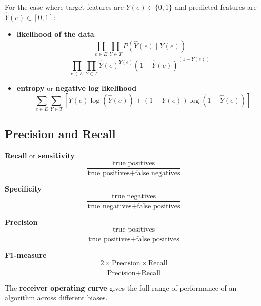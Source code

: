 \documentclass[11pt]{article}
\begin{document}
For the case where target features are \(Y(e) \in \{0, 1\}\) and predicted features are
\(\hat{Y}(e) \in [0, 1]\):
\begin{itemize}
\item \textbf{likelihood of the data}:
$$
  \prod_{e \in E} \prod_{Y \in T} P(\hat{Y}(e) \mid Y(e))
  $$
$$
  \prod_{e \in E} \prod_{Y \in  T} \hat{Y}(e)^{Y(e)} (1 - \hat{Y}(e))^{(1 - Y(e))}
  $$
\item \textbf{entropy} or \textbf{negative log likelihood}
$$
  -\sum_{e \in E} \sum_{Y \in T} \left[ Y(e) \log( \hat{Y}(e) ) + (1 - Y(e)) \log ( 1 - \hat{Y}(e) ) \right]
  $$
\end{itemize}
\subsection{Precision and Recall}
\label{sec:orgdbb25f3}
\textbf{Recall} or \textbf{sensitivity}
$$
\frac{\text{true positives}}{\text{true positives} + \text{false negatives}}
$$

\textbf{Specificity}
$$
\frac{\text{true negatives}}{\text{true negatives} + \text{false positives}}
$$

\textbf{Precision}
$$
\frac{\text{true positives}}{\text{true positives} + \text{false positives}}
$$

\textbf{F1-measure}
$$
\frac{2 \times \text{Precision} \times \text{Recall}}{\text{Precision} + \text{Recall}}
$$

The \textbf{receiver operating curve} gives the full range of performance of an algorithm across different
biases.

\begin{center}
\end{center}
\end{document}

